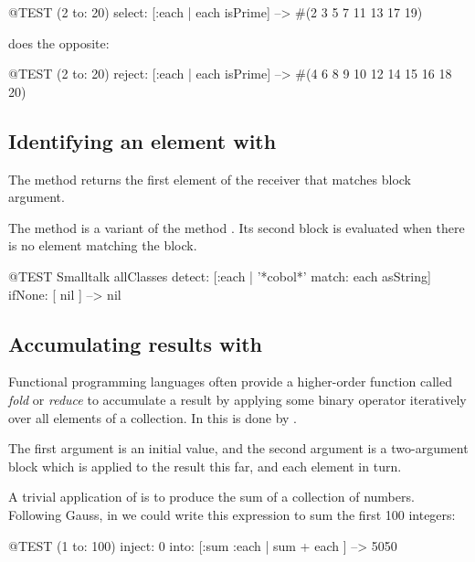 \documentclass[a4paper,10pt,twoside]{book}
\begin{document}
\begin{code}{@TEST}
(2 to: 20) select: [:each | each isPrime] --> #(2 3 5 7 11 13 17 19)
\end{code}

 does the opposite:
\begin{code}{@TEST}
(2 to: 20) reject: [:each | each isPrime] --> #(4 6 8 9 10 12 14 15 16 18 20)
\end{code}

\subsection{Identifying an element with }
The method  returns the first element of the receiver that matches block argument. 


The method  is a variant of the method . Its second block is evaluated
when there is no element matching the block.

\begin{code}{@TEST}
Smalltalk allClasses detect: [:each | '*cobol*' match: each asString] ifNone: [ nil ] --> nil
\end{code}

\subsection{Accumulating results with }
Functional programming languages often provide a higher-order function called \emph{fold} or \emph{reduce} to accumulate a result by applying some binary operator iteratively over all elements of a collection.
In \pharo this is done by .

The first argument is an initial value, and the second argument is a two-argument block which is applied to the result this far, and each element in turn.

A trivial application of  is to produce the sum of a collection of numbers.
Following Gauss, in \pharo we could write this expression to sum the first 100 integers:
\begin{code}{@TEST}
(1 to: 100) inject: 0 into: [:sum :each | sum + each ] --> 5050
\end{code}
\end{document}
